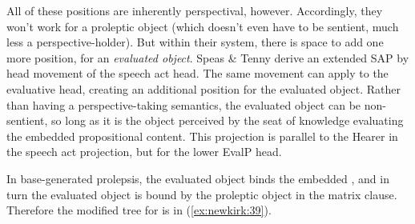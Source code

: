 \documentclass[output=paper,colorlinks,citecolor=brown]{langscibook}
\begin{document}
\ea%
    \label{ex:newkirk:38}
\z


All of these positions are inherently perspectival, however. Accordingly, they won't work for a proleptic object (which doesn't even have to be sentient, much less a perspective-holder). But within their system, there is space to add one more position, for an \emph{evaluated object}. Speas \& Tenny derive an extended SAP by head movement of the speech act head. The same movement can apply to the evaluative head, creating an additional position for the evaluated object. Rather than having a perspective-taking semantics, the evaluated object can be non-sentient, so long as it is the object perceived by the seat of knowledge evaluating the embedded propositional content. This projection is parallel to the Hearer in the speech act projection, but for the lower EvalP head.


In base-generated prolepsis, the evaluated object binds the embedded \agre, and in turn the evaluated object is bound by the proleptic object in the matrix clause. Therefore the modified tree for  is in (\ref{ex:newkirk:39}).

\begin{exe}
\end{exe}
\end{document}
